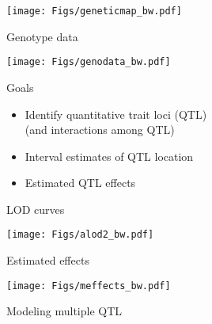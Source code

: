 \documentclass[12pt]{article}
\newcommand{\headsize}{\fontsize{35}{35} \selectfont}
\newcommand{\smallsize}{\fontsize{25}{30} \selectfont}
\begin{document}
\vfill

\centerline{\texttt{[image: Figs/geneticmap\_bw.pdf]}}


\newpage

\headsize \color{myyellow}
\hfill \begin{minipage}{5.75in}
\centering
Genotype data
\end{minipage}

\vfill

\centerline{\texttt{[image: Figs/genodata\_bw.pdf]}}


\newpage

\headsize \color{myyellow}
\hfill \begin{minipage}{5.75in}
\centering
Goals
\end{minipage}

\vspace{3cm}

\color{mywhite} \smallsize

\hfill \begin{minipage}[t]{9.5in}
\begin{itemize}
\itemsep24pt
\item Identify quantitative trait loci (QTL) \\[6pt]
   {\color{myblue}   (and interactions among QTL)}
\item Interval estimates of QTL location
\item Estimated QTL effects
\end{itemize} \end{minipage}

\newpage

\headsize \color{myyellow}
\hfill \begin{minipage}{5.75in}
\centering
LOD curves
\end{minipage}

\vfill

\centerline{\texttt{[image: Figs/alod2\_bw.pdf]}}

\newpage

\headsize \color{myyellow}
\hfill \begin{minipage}{5.75in}
\centering
Estimated effects
\end{minipage}

\vfill

\centerline{\texttt{[image: Figs/meffects\_bw.pdf]}}

\newpage

\headsize \color{myyellow}
\hfill \begin{minipage}{5.75in}
\centering
Modeling multiple QTL
\end{minipage}
\end{document}
